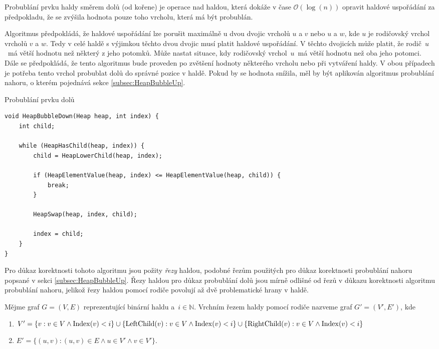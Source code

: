 Probublání prvku haldy směrem dolů (od kořene) je operace nad haldou, která dokáže v čase $\mathcal{O}(\log(n))$ opravit haldové uspořádání za předpokladu, že se zvýšila hodnota pouze toho vrcholu, která má být probublán.

Algoritmus předpokládá, že haldové uspořádání lze porušit maximálně u dvou dvojic vrcholů $u$ a $v$ nebo $u$ a $w$, kde $u$ je rodičovský vrchol vrcholů $v$ a $w$. Tedy v celé haldě s výjimkou těchto dvou dvojic musí platit haldové uspořádání. V těchto dvojicích může platit, že rodič~$u$~má větší hodnotu než některý z jeho potomků. Může nastat situace, kdy rodičovský vrchol~$u$~má větší hodnotu než oba jeho potomci. Dále se předpokládá, že tento algoritmus bude proveden po zvětšení hodnoty některého vrcholu nebo při vytváření haldy. V obou případech je potřeba tento vrchol probublat dolů do správné pozice v haldě. Pokud by se hodnota snížila, měl by být aplikován algoritmus probublání nahoru, o kterém pojednává sekce \ref{subsec:HeapBubbleUp}.


\begin{listing}[H]
	\caption{Probublání prvku dolů}
	\label{list:HeapBubbleDown}
	\begin{verbatim}
void HeapBubbleDown(Heap heap, int index) {
    int child;

    while (HeapHasChild(heap, index)) {
        child = HeapLowerChild(heap, index);

        if (HeapElementValue(heap, index) <= HeapElementValue(heap, child)) {
            break;
        }

        HeapSwap(heap, index, child);

        index = child;
    }
}
	\end{verbatim}
\end{listing}

Pro důkaz korektnosti tohoto algoritmu jsou požity \textit{řezy} haldou, podobné řezům použitých pro důkaz korektnosti probublání nahoru popsané v sekci \ref{subsec:HeapBubbleUp}. Řezy haldou pro důkaz probublání dolů jsou mírně odlišné od řezů v důkazu korektnosti algoritmu probublání nahoru, jelikož řezy haldou pomocí rodiče povolují až dvě problematické hrany v haldě.

\begin{definition}
	Mějme graf $G = (V, E)$ reprezentující binární haldu a~$i \in \mathbb{N}$.
	Vrchním řezem haldy pomocí rodiče nazveme graf $G' = (V', E')$, kde
	\begin{enumerate}
	  \item[] $V' = \{ v: v \in V \land \operatorname{Index}(v) < i \} \cup \{ \operatorname{LeftChild}(v): v \in V \land \operatorname{Index}(v) < i \} \cup \{ \operatorname{RightChild}(v): v \in V \land \operatorname{Index}(v) < i \}$
	  \item[] $E' = \{ (u, v): (u, v) \in E \land u \in V' \land v \in V' \}$.
	\end{enumerate}
\end{definition}

